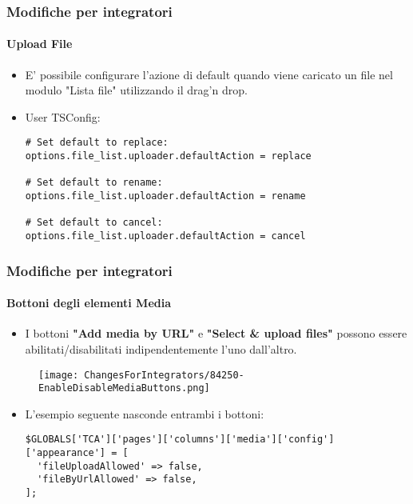 \begin{frame}[fragile]
	\frametitle{Modifiche per integratori}
	\framesubtitle{Upload File}

	\lstset{basicstyle=\smaller\ttfamily}

	\begin{itemize}
		\item E' possibile configurare l'azione di default quando viene caricato un file nel modulo "Lista file" utilizzando il drag'n drop.
		\item User TSConfig:

\begin{lstlisting}
# Set default to replace:
options.file_list.uploader.defaultAction = replace

# Set default to rename:
options.file_list.uploader.defaultAction = rename

# Set default to cancel:
options.file_list.uploader.defaultAction = cancel
\end{lstlisting}

	\end{itemize}

\end{frame}


\begin{frame}[fragile]
	\frametitle{Modifiche per integratori}
	\framesubtitle{Bottoni degli elementi Media}

	\lstset{basicstyle=\tiny\ttfamily}

	\begin{itemize}
		\item I bottoni \textbf{"Add media by URL"} e \textbf{"Select \& upload files"}
			possono essere abilitati/disabilitati indipendentemente l'uno dall'altro.
	\end{itemize}

	\begin{figure}
		\texttt{[image: ChangesForIntegrators/84250-EnableDisableMediaButtons.png]}
	\end{figure}

	\begin{itemize}
		\item L'esempio seguente nasconde entrambi i bottoni:

\begin{lstlisting}
$GLOBALS['TCA']['pages']['columns']['media']['config']['appearance'] = [
  'fileUploadAllowed' => false,
  'fileByUrlAllowed' => false,
];
\end{lstlisting}

	\end{itemize}

\end{frame}

